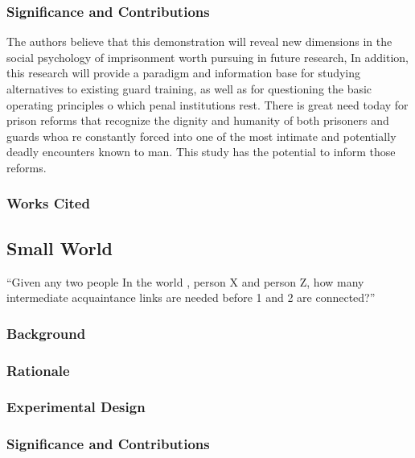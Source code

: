 \begin{refsection}
\subsubsection{Significance and Contributions}
\label{significanceandcontributions}

The authors believe that this demonstration will reveal new dimensions in the social psychology of imprisonment worth pursuing in future research, In addition, this research will provide a paradigm and information base for studying alternatives to existing guard training, as well as for questioning the basic operating principles o which penal institutions rest. There is great need today for prison reforms that recognize the dignity and humanity of both prisoners and guards whoa re constantly forced into one of the most intimate and potentially deadly encounters known to man. This study has the potential to inform those reforms.

\subsubsection{Works Cited}
\label{workscited}

\newpage

\subsection{Small World}
\label{smallworld}

“Given any two people In the world , person X and person Z, how many intermediate acquaintance links are needed before 1 and 2 are connected?”

\subsubsection{Background}
\label{background}

\subsubsection{Rationale}
\label{rationale}

\subsubsection{Experimental Design}
\label{experimentaldesign}

\subsubsection{Significance and Contributions}
\label{significanceandcontributions}


\end{refsection}
